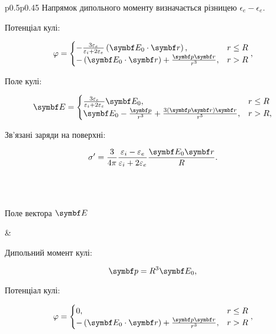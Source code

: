 \begin{center}
\begin{longtable}{p{}p{}}
		{\footnotesize Напрямок дипольного моменту визначається різницею $\epsilon_e - \epsilon_e$.}

		Потенціал кулі:

		\[
			\phi =
			\begin{cases}
				-\frac{3\epsilon_e}{\epsilon_i + 2\epsilon_e}\left( \Efield_0\cdot \vect{r}\right), & r \le R \\
				-\left( \Efield_0\cdot \vect{r}\right) + \frac{\vect{p} \vect{r}}{r^3},             & r > R
			\end{cases}
			,\]

		Поле кулі:

		\[
			\Efield =
			\begin{cases}
				\frac{3\epsilon_e}{\epsilon_i + 2\epsilon_e} \Efield_0,                                 & r \le R \\
				\Efield_0 - \frac{\vect{p}}{r^3} + \frac{3\left(\vect{p}\vect{r}\right)\vect{r} }{r^5}, & r > R,
			\end{cases}
		\]

		Зв'язані заряди на поверхні:

		\[\sigma' = \frac{3}{4\pi} \frac{\epsilon_i - \epsilon_e}{\epsilon_i + 2\epsilon_e} \frac{\Efield_0\vect{r}}{R}.\]


		\\
		\pagebreak
		                                                          \\



		\begin{center}
			Поле вектора $\Efield$
		\end{center}

		\begin{center}
			
		\end{center}

		 &

		Дипольний момент кулі:

		\[\vect{p} = R^3\Efield_0,\]

		Потенціал кулі:

		\[
			\phi =
			\begin{cases}
				0,                                                                      & r \le R \\
				-\left( \Efield_0\cdot \vect{r}\right) + \frac{\vect{p} \vect{r}}{r^3}, & r > R
			\end{cases}
			,\]


\end{longtable}
\end{center}
